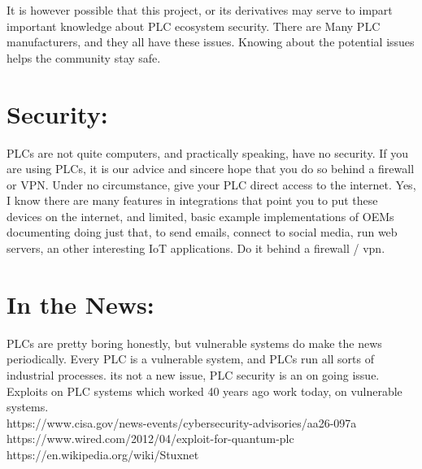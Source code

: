 \documentclass[12pt]{article}
\begin{document}
It is however possible that this project, or its derivatives may serve to impart important knowledge about PLC ecosystem security. There are Many PLC manufacturers, and they all have these issues. Knowing about the potential issues helps the community stay safe. 
\section*{Security:}
	PLCs are not quite computers, and practically speaking, have no security.  
If you are using PLCs, it is our advice and sincere hope that you do so behind a firewall or VPN.
Under no circumstance, give your PLC direct access to the internet. Yes, I know there are many features in integrations that point you to put these devices on the internet, and limited, basic example implementations of OEMs documenting doing just that, to send emails, connect to social media, run web servers, an other interesting IoT applications. Do it behind a firewall / vpn. 


\section*{In the News:}
PLCs are pretty boring honestly, but vulnerable systems do make the news periodically. Every PLC is a vulnerable system, and PLCs run all sorts of industrial processes. its not a new issue, PLC security is an on going issue. Exploits on PLC systems which worked 40 years ago work today, on vulnerable systems. \\
https://www.cisa.gov/news-events/cybersecurity-advisories/aa26-097a\\
https://www.wired.com/2012/04/exploit-for-quantum-plc\\
https://en.wikipedia.org/wiki/Stuxnet\\

\section*{}
\end{document}
